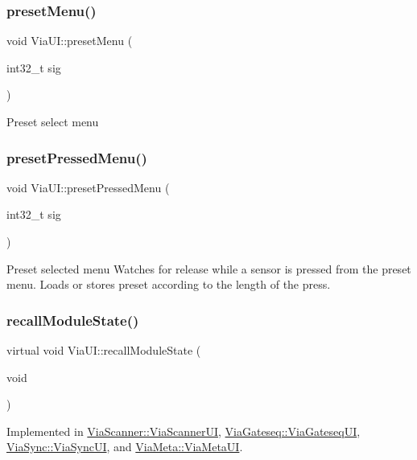 \subsubsection{\texorpdfstring{preset\+Menu()}{presetMenu()}}
{\footnotesize\ttfamily void Via\+U\+I\+::preset\+Menu (\begin{DoxyParamCaption}\item[{int32\+\_\+t}]{sig }\end{DoxyParamCaption})}

Preset select menu \mbox{\label{class_via_u_i_a3f67bd0f296939ab1be2bdef56858fd6}} 
\subsubsection{\texorpdfstring{preset\+Pressed\+Menu()}{presetPressedMenu()}}
{\footnotesize\ttfamily void Via\+U\+I\+::preset\+Pressed\+Menu (\begin{DoxyParamCaption}\item[{int32\+\_\+t}]{sig }\end{DoxyParamCaption})}

Preset selected menu Watches for release while a sensor is pressed from the preset menu. Loads or stores preset according to the length of the press. \mbox{\label{class_via_u_i_ac5b88708650fe41ea955c77de580f6f5}} 
\subsubsection{\texorpdfstring{recall\+Module\+State()}{recallModuleState()}}
{\footnotesize\ttfamily virtual void Via\+U\+I\+::recall\+Module\+State (\begin{DoxyParamCaption}\item[{void}]{ }\end{DoxyParamCaption})\hspace{0.3cm}{\ttfamily [pure virtual]}}



Implemented in \mbox{\hyperlink{class_via_scanner_1_1_via_scanner_u_i_a9513c8ecc955ccfbdaebea4172deb210}{Via\+Scanner\+::\+Via\+Scanner\+UI}}, \mbox{\hyperlink{class_via_gateseq_1_1_via_gateseq_u_i_a4f3313685b65a93e1cd12e458dba34de}{Via\+Gateseq\+::\+Via\+Gateseq\+UI}}, \mbox{\hyperlink{class_via_sync_1_1_via_sync_u_i_a1a59cd903a2e11b698445b02c9fe5a48}{Via\+Sync\+::\+Via\+Sync\+UI}}, and \mbox{\hyperlink{class_via_meta_1_1_via_meta_u_i_a40b2c4c2139c78f273d923fdb0d3f4ce}{Via\+Meta\+::\+Via\+Meta\+UI}}.

